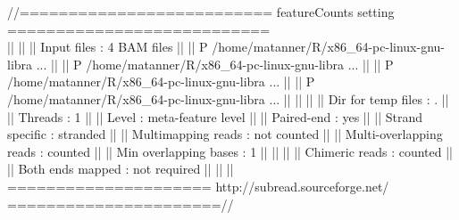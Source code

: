 \documentclass[12pt]{article}
\begin{document}
\begin{scriptsize}
\begin{Schunk}
\begin{Soutput}
//========================== featureCounts setting ===========================\\
||                                                                            ||
||             Input files : 4 BAM files                                      ||
||                           P /home/matanner/R/x86_64-pc-linux-gnu-libra ... ||
||                           P /home/matanner/R/x86_64-pc-linux-gnu-libra ... ||
||                           P /home/matanner/R/x86_64-pc-linux-gnu-libra ... ||
||                           P /home/matanner/R/x86_64-pc-linux-gnu-libra ... ||
||                                                                            ||
||      Dir for temp files : .                                                ||
||                 Threads : 1                                                ||
||                   Level : meta-feature level                               ||
||              Paired-end : yes                                              ||
||         Strand specific : stranded                                         ||
||      Multimapping reads : not counted                                      ||
|| Multi-overlapping reads : counted                                          ||
||   Min overlapping bases : 1                                                ||
||                                                                            ||
||          Chimeric reads : counted                                          ||
||        Both ends mapped : not required                                     ||
||                                                                            ||
\\===================== http://subread.sourceforge.net/ ======================//


\end{Soutput}
\end{Schunk}
\end{scriptsize}
\end{document}

